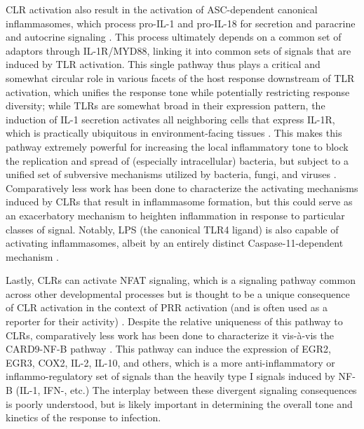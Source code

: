CLR activation also result in the activation of ASC-dependent canonical inflammasomes, which process pro-IL-1\textbeta{} and pro-IL-18 for secretion and paracrine and autocrine signaling \citep{Petrilli2005}. This process ultimately depends on a common set of adaptors through IL-1R/MYD88, linking it into common sets of signals that are induced by TLR activation. This single pathway thus plays a critical and somewhat circular role in various facets of the host response downstream of TLR activation, which unifies the response tone while potentially restricting response diversity; while TLRs are somewhat broad in their expression pattern, the induction of IL-1\textbeta{} secretion activates all neighboring cells that express IL-1R, which is practically ubiquitous in environment-facing tissues \citep{Deyerle1992, Malik2018}. This makes this pathway extremely powerful for increasing the local inflammatory tone to block the replication and spread of (especially intracellular) bacteria, but subject to a unified set of subversive mechanisms utilized by bacteria, fungi, and viruses \citep{Wein2002, MacMicking2012}. Comparatively less work has been done to characterize the activating mechanisms induced by CLRs that result in inflammasome formation, but this could serve as an exacerbatory mechanism to heighten inflammation in response to particular classes of signal. Notably, LPS (the canonical TLR4 ligand) is also capable of activating inflammasomes, albeit by an entirely distinct Caspase-11-dependent mechanism \citep{Hagar2013, Vanaja2016, Pilla2017, Finethy2020}.

Lastly, CLRs can activate NFAT signaling, which is a signaling pathway common across other developmental processes but is thought to be a unique consequence of CLR activation in the context of PRR activation (and is often used as a reporter for their activity) \citep{Wilkins2004, Chow1999, Jauliac2002, Aramburu1998, HannantaAnan2016, Hooijberg2000, Goodridge2007, Goodridge2008, Bendickova2020, Fuller2007, Zhao2014}. Despite the relative uniqueness of this pathway to CLRs, comparatively less work has been done to characterize it vis-\`{a}-vis the CARD9-NF-\textkappa B pathway \citep{Goodridge2007, Goodridge2009, Deerhake2021}. This pathway can induce the expression of EGR2, EGR3, COX2, IL-2, IL-10, and others, which is a more anti-inflammatory or inflammo-regulatory set of signals than the heavily type I signals induced by NF-\textkappa B (IL-1, IFN-\textgamma, etc.) The interplay between these divergent signaling consequences is poorly understood, but is likely important in determining the overall tone and kinetics of the response to infection.

